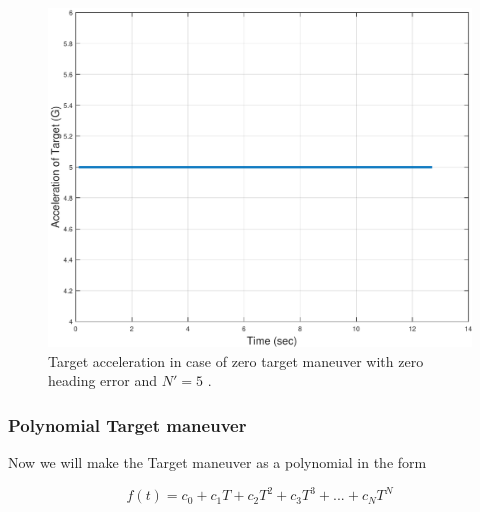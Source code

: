 \begin{figure}[H]
	\centering
	\includegraphics[scale = 0.35]{fig/TargetAccelerationXNT5HE0N5.pdf}
	\caption{Target acceleration in case of zero target maneuver with zero heading error and $N'=5$ .}
	\label{Target accelerationXNT5HE0N5}
\end{figure}


\subsubsection{Polynomial Target maneuver}
Now we will make the Target maneuver as a polynomial in the form

\begin{equation}
f(t) = c_0 + c_1 T + c_2 T^2 + c_3 T^3 + ... + c_N T^N
\end{equation} 

